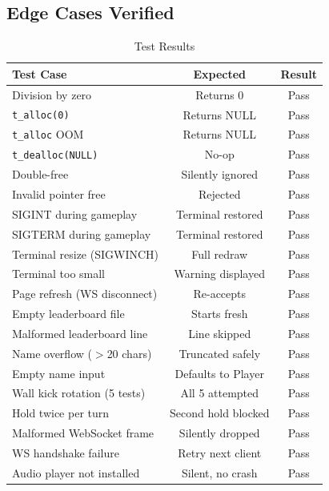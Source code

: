 \documentclass[conference]{IEEEtran}
\begin{document}
\subsection{Edge Cases Verified}

\begin{table}[H]
\centering
\caption{Test Results}
\begin{tabular}{lcc}
\toprule
\textbf{Test Case}              & \textbf{Expected}   & \textbf{Result} \\
\midrule
Division by zero                & Returns 0           & Pass \\
\texttt{t\_alloc(0)}            & Returns NULL        & Pass \\
\texttt{t\_alloc} OOM           & Returns NULL        & Pass \\
\texttt{t\_dealloc(NULL)}       & No-op               & Pass \\
Double-free                     & Silently ignored    & Pass \\
Invalid pointer free            & Rejected            & Pass \\
SIGINT during gameplay          & Terminal restored   & Pass \\
SIGTERM during gameplay         & Terminal restored   & Pass \\
Terminal resize (SIGWINCH)      & Full redraw         & Pass \\
Terminal too small              & Warning displayed   & Pass \\
Page refresh (WS disconnect)    & Re-accepts          & Pass \\
Empty leaderboard file          & Starts fresh        & Pass \\
Malformed leaderboard line      & Line skipped        & Pass \\
Name overflow ($>$20 chars)     & Truncated safely    & Pass \\
Empty name input                & Defaults to Player  & Pass \\
Wall kick rotation (5 tests)    & All 5 attempted     & Pass \\
Hold twice per turn             & Second hold blocked & Pass \\
Malformed WebSocket frame       & Silently dropped    & Pass \\
WS handshake failure            & Retry next client   & Pass \\
Audio player not installed      & Silent, no crash    & Pass \\
\bottomrule
\end{tabular}
\end{table}
\end{document}
